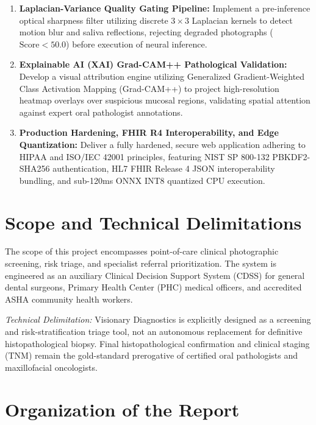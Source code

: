 \documentclass[12pt,a4paper,oneside]{report}
\begin{document}
\begin{enumerate}[label=\textbf{O\arabic*:}]
    \item \textbf{Laplacian-Variance Quality Gating Pipeline:} Implement a pre-inference optical sharpness filter utilizing discrete $3\times 3$ Laplacian kernels to detect motion blur and saliva reflections, rejecting degraded photographs ($\text{Score} < 50.0$) before execution of neural inference.
    
    \item \textbf{Explainable AI (XAI) Grad-CAM++ Pathological Validation:} Develop a visual attribution engine utilizing Generalized Gradient-Weighted Class Activation Mapping (Grad-CAM++) to project high-resolution heatmap overlays over suspicious mucosal regions, validating spatial attention against expert oral pathologist annotations.
    
    \item \textbf{Production Hardening, FHIR R4 Interoperability, and Edge Quantization:} Deliver a fully hardened, secure web application adhering to HIPAA and ISO/IEC 42001 principles, featuring NIST SP 800-132 PBKDF2-SHA256 authentication, HL7 FHIR Release 4 JSON interoperability bundling, and sub-120ms ONNX INT8 quantized CPU execution.
\end{enumerate}

\section{Scope and Technical Delimitations}
\label{sec:scope}

The scope of this project encompasses point-of-care clinical photographic screening, risk triage, and specialist referral prioritization. The system is engineered as an auxiliary Clinical Decision Support System (CDSS) for general dental surgeons, Primary Health Center (PHC) medical officers, and accredited ASHA community health workers. 

\textit{Technical Delimitation:} Visionary Diagnostics is explicitly designed as a screening and risk-stratification triage tool, not an autonomous replacement for definitive histopathological biopsy. Final histopathological confirmation and clinical staging (TNM) remain the gold-standard prerogative of certified oral pathologists and maxillofacial oncologists.

\section{Organization of the Report}
\label{sec:organization}
\end{document}
